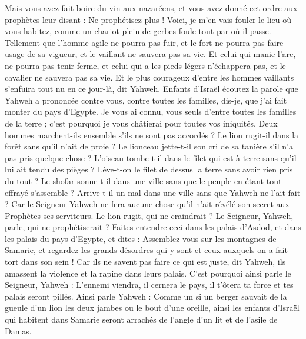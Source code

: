\begin{multicols}{2}
Mais vous avez fait boire du vin aux nazaréens, et vous avez donné cet ordre aux prophètes leur disant : Ne prophétisez plus !
Voici, je m'en vais fouler le lieu où vous habitez, comme un chariot plein de gerbes foule tout par où il passe.
Tellement que l'homme agile ne pourra pas fuir, et le fort ne pourra pas faire usage de sa vigueur, et le vaillant ne sauvera pas sa vie.
Et celui qui manie l'arc, ne pourra pas tenir ferme, et celui qui a les pieds légers n'échappera pas, et le cavalier ne sauvera pas sa vie.
Et le plus courageux d'entre les hommes vaillants s'enfuira tout nu en ce jour-là, dit Yahweh.
\VerseOne{}Enfants d'Israël écoutez la parole que Yahweh a prononcée contre vous, contre toutes les familles, dis-je, que j'ai fait monter du pays d'Egypte.
Je vous ai connu, vous seuls d'entre toutes les familles de la terre ; c'est pourquoi je vous châtierai pour toutes vos iniquités.
Deux hommes marchent-ils ensemble s'ils ne sont pas accordés ?
  Le lion rugit-il dans la forêt sans qu'il n'ait de proie ? Le lionceau jette-t-il son cri de sa tanière s'il n'a pas pris quelque chose ?
L'oiseau tombe-t-il dans le filet qui est à terre sans qu'il lui ait tendu des pièges ? Lève-t-on le filet de dessus la terre sans avoir rien pris du tout ?
Le shofar sonne-t-il dans une ville sans que le peuple en étant tout effrayé s'assemble ? Arrive-t-il un mal dans une ville sans que Yahweh ne l'ait fait ?
Car le Seigneur Yahweh ne fera aucune chose qu'il n'ait révélé son secret aux Prophètes ses serviteurs. 
Le lion rugit, qui ne craindrait ? Le Seigneur, Yahweh, parle, qui ne prophétiserait ?
Faites entendre ceci dans les palais d'Asdod, et dans les palais du pays d'Egypte, et dites : Assemblez-vous sur les montagnes de Samarie, et regardez les grands désordres qui y sont et ceux auxquels on a fait tort dans son sein !
Car ils ne savent pas faire ce qui est juste, dit Yahweh, ils amassent la violence et la rapine dans leurs palais.
C'est pourquoi ainsi parle le Seigneur, Yahweh : L'ennemi viendra, il cernera le pays, il t'ôtera ta force et tes palais seront pillés.
Ainsi parle Yahweh : Comme un si un berger sauvait de la gueule d'un lion les deux jambes ou le bout d'une oreille, ainsi les enfants d'Israël qui habitent dans Samarie seront arrachés de l'angle d'un lit et de l'asile de Damas.

\end{multicols}
